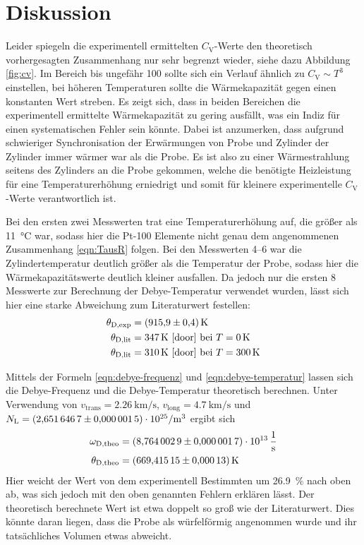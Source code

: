 \section{Diskussion}
\label{sec:Diskussion}

Leider spiegeln die experimentell ermittelten $C_\text{V}$-Werte den
theoretisch vorhergesagten Zusammenhang nur sehr begrenzt wieder, siehe
dazu Abbildung \ref{fig:cv}. Im Bereich bis ungefähr \SI{100}{\grd} sollte sich
ein Verlauf ähnlich zu $C_\text{V} \sim T^3$ einstellen, bei höheren
Temperaturen sollte die Wärmekapazität gegen einen konstanten Wert
streben. Es zeigt sich, dass in beiden Bereichen die experimentell
ermittelte Wärmekapazität zu gering ausfällt, was ein Indiz für einen
systematischen Fehler sein könnte. Dabei ist anzumerken, dass aufgrund
schwieriger Synchronisation der Erwärmungen von Probe und Zylinder
der Zylinder immer wärmer war als die Probe. Es ist also zu einer
Wärmestrahlung seitens des Zylinders an die Probe gekommen, welche die benötigte
Heizleistung für eine Temperaturerhöhung erniedrigt und somit für kleinere
experimentelle $C_\text{V}$-Werte verantwortlich ist.

Bei den ersten zwei Messwerten trat eine Temperaturerhöhung auf, die
größer als \SI{11}{\celsius} war, sodass hier die Pt-100 Elemente nicht
genau dem angenommenen Zusammenhang \eqref{eqn:TausR} folgen. Bei den Messwerten
\numrange{4}{6} war die Zylindertemperatur deutlich größer als die
Temperatur der Probe, sodass hier die Wärmekapazitätswerte deutlich kleiner
ausfallen. Da jedoch nur die ersten \num{8} Messwerte zur Berechnung der
Debye-Temperatur verwendet wurden, lässt sich hier eine starke Abweichung
zum Literaturwert festellen:
\begin{align*}
    \theta_\text{D,exp} &= \SI{915.9(4)}{\kelvin} \\
    \theta_\text{D,lit} &= \SI{347}{\kelvin} \text{ \cite{door} bei }T = \SI{0}{\kelvin} \\
    \theta_\text{D,lit} &= \SI{310}{\kelvin} \text{ \cite{door} bei }T = \SI{300}{\kelvin}
\end{align*}

Mittels der Formeln
\eqref{eqn:debye-frequenz} und \eqref{eqn:debye-temperatur}
lassen sich die Debye-Frequenz und die Debye-Temperatur theoretisch
berechnen. Unter Verwendung von
$v_\text{trans}=\SI{2.26}{\kilo\meter\per\second}$,
$v_\text{long}=\SI{4.7}{\kilo\meter\per\second}$ \cite[p.~5]{anleitung}
und $N_\text{L}=\SI{2.6516467(15)e25}{\raiseto{-3}\meter}$ \cite{Codata}
ergibt sich
\begin{align*}
    \omega_\text{D,theo} &= \SI{8.7640029(17)e+13}{\raiseto{-1}\second} \\
    \theta_\text{D,theo} &= \SI{669.41515(13)}{\kelvin}
\end{align*}
Hier weicht der Wert von dem experimentell Bestimmten um \SI{26.9}{\percent}
nach oben ab, was sich jedoch mit den oben genannten Fehlern erklären lässt.
Der theoretisch berechnete Wert ist etwa doppelt so groß wie der Literaturwert.
Dies könnte daran liegen, dass die Probe als würfelförmig angenommen wurde und
ihr tatsächliches Volumen etwas abweicht.

